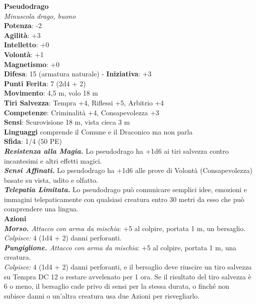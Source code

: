\begin{multicols}{2}
\medskip\textbf{Pseudodrago}\\
\emph{Minuscola drago, buono}\\
\textbf{Potenza}: -2\\
\textbf{Agilità}: +3\\
\textbf{Intelletto}: +0\\
\textbf{Volontà}: +1\\
\textbf{Magnetismo}: +0\\
\textbf{Difesa}: 15 (armatura naturale) - \textbf{Iniziativa}: +3\\
\textbf{Punti Ferita}: 7 (2d4 + 2)\\
\textbf{Movimento}: 4,5 m, volo 18 m\\
\textbf{Tiri Salvezza}: Tempra +4, Riflessi +5, Arbitrio +4\\
\textbf{Competenze}: Criminalità +4, Consapevolezza +3\\
\textbf{Sensi}: Scurovisione 18 m, vista cieca 3 m\\
\textbf{Linguaggi} comprende il Comune e il Draconico ma non parla\\
\textbf{Sfida}: 1/4 (50 PE)\smallskip\\
\emph{\textbf{Resistenza alla Magia.}} Lo pseudodrago ha +1d6 ai tiri salvezza contro incantesimi e altri effetti magici.\\
\emph{\textbf{Sensi Affinati.}} Lo pseudodrago ha +1d6 alle prove di Volontà (Consapevolezza) basate su vista, udito e olfatto.\\
\emph{\textbf{Telepatia Limitata.}} Lo pseudodrago può comunicare semplici idee, emozioni e immagini telepaticamente con qualsiasi creatura entro 30 metri da esso che può comprendere una lingua. \\
\smallskip\textbf{Azioni}\\
\emph{\textbf{Morso.} Attacco con arma da mischia}: +5 al colpire, portata 1 m, un bersaglio.\\
\emph{Colpisce:} 4 (1d4 + 2) danni perforanti.\\
\emph{\textbf{Pungiglione.} Attacco con arma da mischia}: +5 al colpire, portata 1 m, una creatura.\\
\emph{Colpisce:} 4 (1d4 + 2) danni perforanti, e il bersaglio deve riuscire un tiro salvezza su Tempra DC  12 o restare avvelenato per 1 ora. Se il risultato del tiro salvezza è 6 o meno, il bersaglio cade privo di sensi per la stessa durata, o finché non subisce danni o un'altra creatura usa due Azioni per risvegliarlo.\\

\end{multicols}
